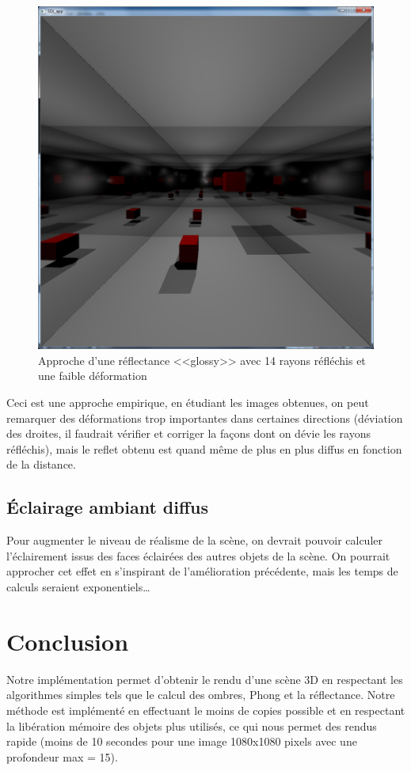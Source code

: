 \documentclass{article}
\begin{document}
\begin{figure}[!ht]
    \center
    \includegraphics[width=1.00\textwidth]{img/p5mc4.png}
    \caption{Approche d'une réflectance <<glossy>> avec 14 rayons réfléchis et une faible déformation}
    \label{glossy2}
\end{figure}

Ceci est une approche
empirique, en étudiant les images obtenues, on peut remarquer des déformations trop importantes dans certaines
directions (déviation des droites, il faudrait vérifier et corriger la façons dont on dévie les rayons réfléchis), mais le reflet obtenu est quand même de plus en plus diffus en fonction de la
distance.
\subsection{Éclairage ambiant diffus}

Pour augmenter le niveau de réalisme de la scène, on devrait pouvoir calculer l'éclairement issus des faces éclairées
des autres objets de la scène. On pourrait approcher cet effet en s'inspirant de l'amélioration précédente, mais les
temps de calculs seraient exponentiels\ldots

\section{Conclusion}
Notre implémentation permet d'obtenir le rendu d'une scène 3D en respectant les algorithmes simples tels que le
calcul des ombres, Phong et la réflectance. Notre méthode est implémenté en effectuant le moins de copies possible
et en respectant la libération mémoire des objets plus utilisés, ce qui nous permet des rendus rapide (moins de 10 secondes pour
une image 1080x1080 pixels avec une profondeur max = 15).
\end{document}
